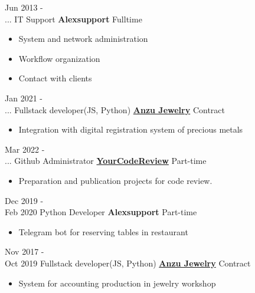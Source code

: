 \documentclass[letterpaper]{twentysecondcv} %
\begin{document}
\begin{twenty}
    \twentyitem
        {Jun 2013 - \\ ...}
        {IT Support}
        {\textbf{Alexsupport}}
        {Fulltime}
        {
            \begin{itemize}
                \item System and network administration
                \item Workflow organization
                \item Contact with clients
            \end{itemize}
        }
    \twentyitem
        {Jan 2021 - \\ ...}
        {Fullstack developer(JS, Python)}
        {\href{https://anzujewelry.com/}{\textbf{Anzu Jewelry}}}
        {Contract}
        {
            \begin{itemize}
                \item Integration with digital registration system of precious metals
            \end{itemize}
        }
    \twentyitem
        {Mar 2022 - \\ ...}
        {Github Administrator}
        {\href{https://yourcodereview.com/}{\textbf{YourCodeReview}}}
        {Part-time}
        {
            \begin{itemize}
                \item Preparation and publication projects for code review.
            \end{itemize}
        }
    \twentyitem
        {Dec 2019 - \\ Feb 2020}
        {Python Developer}
        {\textbf{Alexsupport}}
        {Part-time}
        {
            \begin{itemize}
                \item Telegram bot for reserving tables in restaurant
            \end{itemize}
        }
    \twentyitem
        {Nov 2017 - \\ Oct 2019}
        {Fullstack developer(JS, Python) }
        {\href{https://anzujewelry.com/}{\textbf{Anzu Jewelry}}}
        {Contract}
        {
            \begin{itemize}
                \item System for accounting production in jewelry workshop

\end{itemize}}
\end{twenty}
\end{document}
